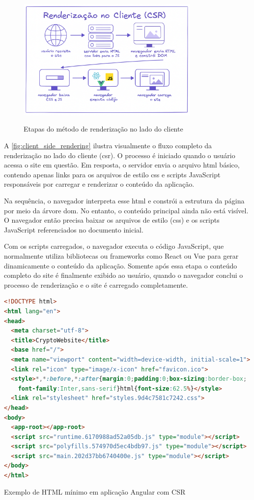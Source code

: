 \begin{figure}[h!]
    \centering
    \caption{Etapas do método de renderização no lado do cliente}
    \includegraphics[width=0.8\textwidth]{media/client_side_rendering.png}
    \label{fig:client_side_rendering}
\end{figure}


A \autoref{fig:client_side_rendering} ilustra visualmente o fluxo completo da renderização no lado do cliente (\acrshort{csr}). O processo é iniciado quando o usuário acessa o site em questão. Em resposta, o servidor envia o arquivo \acrshort{html} básico, contendo apenas links para os arquivos de estilo \acrshort{css} e scripts JavaScript responsáveis por carregar e renderizar o conteúdo da aplicação.

Na sequência, o navegador interpreta esse \acrshort{html} e constrói a estrutura da página por meio da árvore \acrshort{dom}. No entanto, o conteúdo principal ainda não está visível. O navegador então precisa baixar os arquivos de estilo (\acrshort{css}) e os scripts JavaScript referenciados no documento inicial.

Com os scripts carregados, o navegador executa o código JavaScript, que normalmente utiliza bibliotecas ou frameworks como React ou Vue para gerar dinamicamente o conteúdo da aplicação. Somente após essa etapa o conteúdo completo do site é finalmente exibido ao usuário, quando o navegador conclui o processo de renderização e o site é carregado completamente.

\begin{codigo}[H]
  \begin{lstlisting}[language=html]
<!DOCTYPE html>
<html lang="en">
<head>
  <meta charset="utf-8">
  <title>CryptoWebsite</title>
  <base href="/">
  <meta name="viewport" content="width=device-width, initial-scale=1">
  <link rel="icon" type="image/x-icon" href="favicon.ico">
  <style>*,*:before,*:after{margin:0;padding:0;box-sizing:border-box;
    font-family:Inter,sans-serif}html{font-size:62.5%}</style>
  <link rel="stylesheet" href="styles.9d4c7581c7242.css">
</head>
<body>
  <app-root></app-root>
  <script src="runtime.6170988ad52a05db.js" type="module"></script>
  <script src="polyfills.574970d5ec4bdb97.js" type="module"></script>
  <script src="main.202d37bb6740400e.js" type="module"></script>
</body>
</html>
\end{lstlisting}
  \caption{Exemplo de HTML mínimo em aplicação Angular com CSR}
  \label{lst:angular_html}
\end{codigo}

